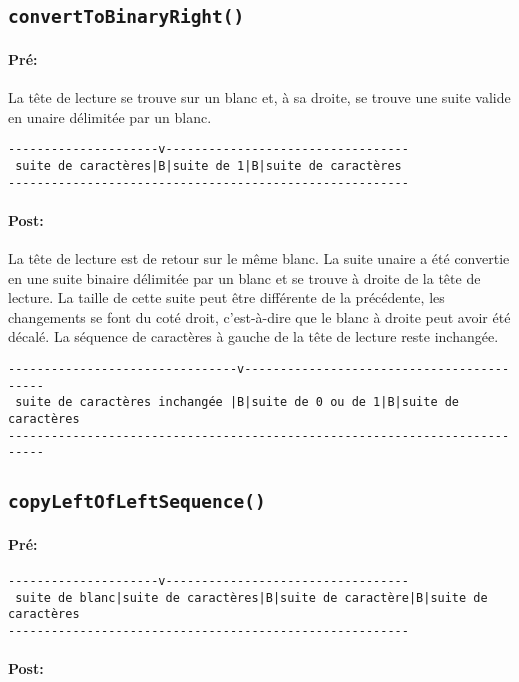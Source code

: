 \documentclass[a4paper,11pt]{article}
\begin{document}
\subsection{\texttt{convertToBinaryRight()}}
\paragraph{Pré:}
La tête de lecture se trouve sur un blanc et, à sa droite, se trouve une suite valide en unaire délimitée par un blanc.
\begin{verbatim}
---------------------v----------------------------------
 suite de caractères|B|suite de 1|B|suite de caractères
--------------------------------------------------------
\end{verbatim}
\paragraph{Post:}
La tête de lecture est de retour sur le même blanc. La suite unaire a été convertie en une suite binaire délimitée par un blanc et se trouve à droite de la tête de lecture.
La taille de cette suite peut être différente de la précédente, les changements se font du coté droit, c'est-à-dire que le blanc à droite peut avoir été décalé. La séquence de caractères à gauche de la tête de lecture reste inchangée.
\begin{verbatim}
--------------------------------v------------------------------------------
 suite de caractères inchangée |B|suite de 0 ou de 1|B|suite de caractères
---------------------------------------------------------------------------
\end{verbatim}
\subsection{\texttt{copyLeftOfLeftSequence()}}
\paragraph{Pré:} 
\begin{verbatim}
---------------------v----------------------------------
 suite de blanc|suite de caractères|B|suite de caractère|B|suite de caractères
--------------------------------------------------------
\end{verbatim}
\paragraph{Post:}
\begin{verbatim}
\end{verbatim}
\end{document}
